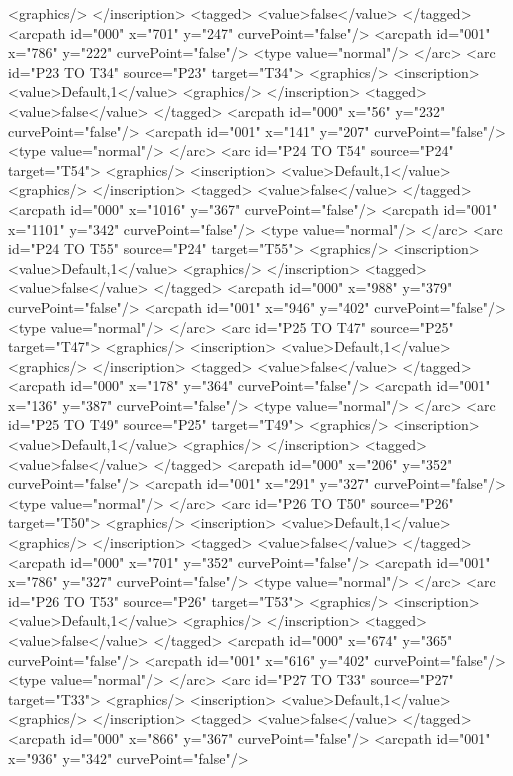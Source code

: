 <graphics/>
</inscription>
<tagged>
<value>false</value>
</tagged>
<arcpath id="000" x="701" y="247" curvePoint="false"/>
<arcpath id="001" x="786" y="222" curvePoint="false"/>
<type value="normal"/>
</arc>
<arc id="P23 TO T34" source="P23" target="T34">
<graphics/>
<inscription>
<value>Default,1</value>
<graphics/>
</inscription>
<tagged>
<value>false</value>
</tagged>
<arcpath id="000" x="56" y="232" curvePoint="false"/>
<arcpath id="001" x="141" y="207" curvePoint="false"/>
<type value="normal"/>
</arc>
<arc id="P24 TO T54" source="P24" target="T54">
<graphics/>
<inscription>
<value>Default,1</value>
<graphics/>
</inscription>
<tagged>
<value>false</value>
</tagged>
<arcpath id="000" x="1016" y="367" curvePoint="false"/>
<arcpath id="001" x="1101" y="342" curvePoint="false"/>
<type value="normal"/>
</arc>
<arc id="P24 TO T55" source="P24" target="T55">
<graphics/>
<inscription>
<value>Default,1</value>
<graphics/>
</inscription>
<tagged>
<value>false</value>
</tagged>
<arcpath id="000" x="988" y="379" curvePoint="false"/>
<arcpath id="001" x="946" y="402" curvePoint="false"/>
<type value="normal"/>
</arc>
<arc id="P25 TO T47" source="P25" target="T47">
<graphics/>
<inscription>
<value>Default,1</value>
<graphics/>
</inscription>
<tagged>
<value>false</value>
</tagged>
<arcpath id="000" x="178" y="364" curvePoint="false"/>
<arcpath id="001" x="136" y="387" curvePoint="false"/>
<type value="normal"/>
</arc>
<arc id="P25 TO T49" source="P25" target="T49">
<graphics/>
<inscription>
<value>Default,1</value>
<graphics/>
</inscription>
<tagged>
<value>false</value>
</tagged>
<arcpath id="000" x="206" y="352" curvePoint="false"/>
<arcpath id="001" x="291" y="327" curvePoint="false"/>
<type value="normal"/>
</arc>
<arc id="P26 TO T50" source="P26" target="T50">
<graphics/>
<inscription>
<value>Default,1</value>
<graphics/>
</inscription>
<tagged>
<value>false</value>
</tagged>
<arcpath id="000" x="701" y="352" curvePoint="false"/>
<arcpath id="001" x="786" y="327" curvePoint="false"/>
<type value="normal"/>
</arc>
<arc id="P26 TO T53" source="P26" target="T53">
<graphics/>
<inscription>
<value>Default,1</value>
<graphics/>
</inscription>
<tagged>
<value>false</value>
</tagged>
<arcpath id="000" x="674" y="365" curvePoint="false"/>
<arcpath id="001" x="616" y="402" curvePoint="false"/>
<type value="normal"/>
</arc>
<arc id="P27 TO T33" source="P27" target="T33">
<graphics/>
<inscription>
<value>Default,1</value>
<graphics/>
</inscription>
<tagged>
<value>false</value>
</tagged>
<arcpath id="000" x="866" y="367" curvePoint="false"/>
<arcpath id="001" x="936" y="342" curvePoint="false"/>
